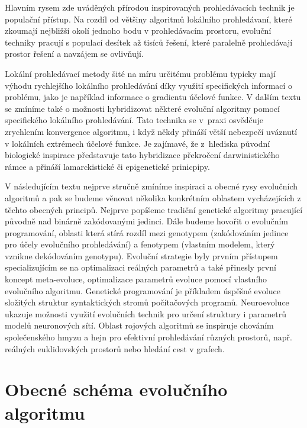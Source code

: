 \documentclass[12pt,fleqn,a4paper,proc]{article}
\begin{document}
Hlavním rysem zde uváděných přírodou inspirovaných prohledávacích technik je populační přístup. Na rozdíl od většiny algoritmů lokálního prohledávaní, které zkoumají nejbližší okolí jednoho bodu v prohledávacím prostoru, evoluční techniky pracují s populací desítek až tisíců řešení, které paralelně prohledávají prostor řešení a navzájem se ovlivňují. 

Lokální prohledávací metody šité na míru určitému problému typicky mají výhodu rychlejšího lokálního prohledávání díky využití specifických informací o problému, jako je například informace o gradientu účelové funkce. V dalším textu se zmíníme také o možnosti hybridizovat některé evoluční algoritmy pomocí specifického lokálního prohledávání. Tato technika se v~praxi osvědčuje zrychlením konvergence algoritmu, i když někdy přináší větší nebezpečí uváznutí v lokálních extrémech účelové funkce. Je zajímavé, že z~hlediska původní biologické inspirace představuje tato hybridizace překročení darwinistického rámce a přináší lamarckistické či epigenetické prinicpipy. 

V následujícím textu nejprve stručně zmíníme inspiraci a obecné rysy evolučních algoritmů a pak se budeme věnovat několika konkrétním oblastem vycházejících z těchto obecných principů. Nejprve popíšeme tradiční genetické algoritmy pracující původně nad binárně zakódovanými jedinci. Dále budeme hovořit o evolučním programování, oblasti která stírá rozdíl mezi genotypem (zakódováním jedince pro účely evolučního prohledávání) a fenotypem (vlastním modelem, který vznikne dekódováním genotypu). Evoluční strategie byly prvním přístupem specializujícím se na optimalizaci reálných parametrů a také přinesly první koncept meta-evoluce, optimalizace parametrů evoluce pomocí vlastního evolučního algoritmu. Genetické programování je příkladem úspěšné evoluce složitých struktur syntaktických stromů počítačových programů. Neuroevoluce ukazuje možnosti využití evolučních technik pro určení struktury i parametrů modelů neuronových sítí. Oblast rojových algoritmů se inspiruje chováním společenského hmyzu a hejn pro efektivní prohledávání různých prostorů, např. reálných euklidovských prostorů nebo hledání cest v grafech. 

\section{Obecné schéma evolučního algoritmu}
\end{document}
